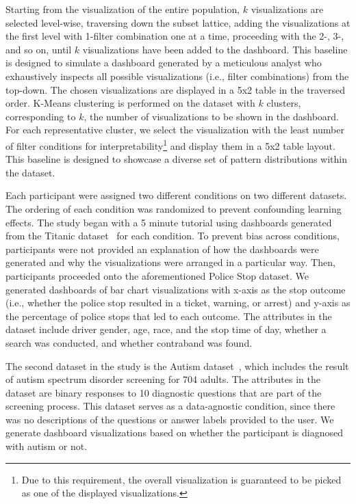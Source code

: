  Starting from the visualization of the entire population, $k$ visualizations are selected level-wise, traversing down the subset lattice, adding the visualizations at the first level with 1-filter combination one at a time, proceeding with the 2-, 3-, and so on, until $k$ visualizations have been added to the dashboard. This baseline is designed to simulate a dashboard generated by a meticulous analyst who exhaustively inspects all possible visualizations (i.e., filter combinations) from the top-down. The chosen visualizations are displayed in a 5x2 table in the traversed order.
\stitle{\cluster:} K-Means clustering is performed on the dataset with $k$ clusters, corresponding to $k$, the number of visualizations to be shown in the dashboard. For each representative cluster, we select the visualization with the least number of filter conditions for interpretability\footnote{Due to this requirement, the overall visualization is guaranteed to be picked as one of the displayed visualizations.} and display them in a 5x2 table layout. This baseline is designed to showcase a diverse set of pattern distributions within the dataset.
\par Each participant were assigned two different conditions on two different datasets. The ordering of each condition was randomized to prevent confounding learning effects. The study began with a 5 minute tutorial using dashboards generated from the Titanic dataset~\cite{titanic} for each condition. To prevent bias across conditions, participants were not provided an explanation of how the dashboards were generated and why the visualizations were arranged in a particular way. Then, participants proceeded onto the aforementioned Police Stop dataset. We generated dashboards of bar chart visualizations with x-axis as the stop outcome (i.e., whether the police stop resulted in a ticket, warning, or arrest) and y-axis as the percentage of police stops that led to each outcome. The attributes in the dataset include driver gender, age, race, and the stop time of day, whether a search was conducted, and whether contraband was found. %
\par The second dataset in the study is the Autism dataset~\cite{autism}, which includes the result of autism spectrum disorder screening for 704 adults. The attributes in the dataset are binary responses to 10 diagnostic questions that are part of the screening process. This dataset serves as a data-agnostic condition, since there was no descriptions of the questions or answer labels provided to the user. We generate dashboard visualizations based on whether the participant is diagnosed with autism or not. 
